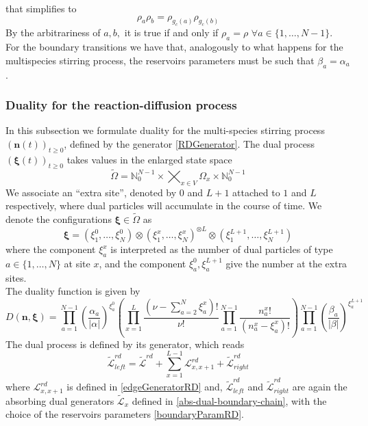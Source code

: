 \documentclass[10pt]{article}
\numberwithin{equation}{section}
\numberwithin{equation}{subsection}
\begin{document}
that simplifies to 
\begin{equation}
	\rho_{a}\rho_{b}=\rho_{g_{c}(a)}\rho_{g_{c}(b)}
\end{equation}
By the arbitrariness of $a,b,$ it is true if and only if $\rho_{a}=\rho$ $\forall a\in \{1,\ldots,N-1\}$.\\
For the boundary transitions we have that, analogously to what happens for the multispecies stirring process, the reservoirs parameters must be such that $\beta_{a}=\alpha_{a}$.
\subsubsection{Duality for the reaction-diffusion process}
In this subsection we formulate duality for the multi-species stirring process $(\bm{n}(t))_{t\geq 0}$, defined by the generator \eqref{RDGenerator}.
The dual  process $(\bm{\xi}(t))_{t\geq 0}$ takes values in the enlarged state space
\begin{equation}
	\widetilde{\Omega}=\mathbb{N}_{0}^{N-1}\times  \bigtimes_{x\in V} \Omega_{x}\times \mathbb{N}_{0}^{N-1}
\end{equation}
We associate an ``extra site'', denoted by $0$ and $L+1$ attached to $1$ and $L$ respectively,
where dual particles will accumulate in the course of time. 
We denote the configurations $\bm{\xi} \in \widetilde\Omega$  as
\begin{equation}
	\bm{\xi}=\left(\xi_{1}^{0},\ldots,\xi_{N}^{0}\right)\otimes\left(\xi_{1}^{x},\ldots,\xi_{N}^{x}\right)^{\otimes L}\otimes \left(\xi_{1}^{L+1},\ldots,\xi_{N}^{L+1}\right)
\end{equation}
where the component $\xi_{a}^{x}$ is interpreted as the number of dual particles of type $a\in \{1,\ldots,N\}$ at site $x$, 
and the component $\xi_{a}^{0},\xi_{a}^{L+1}$  give the number at the extra sites. \\
The duality function is given by
\begin{equation}
	D(\bm{n},\bm{\xi})=\prod_{a=1}^{N-1}\left(\frac{\alpha_{a}}{|\alpha|}\right)^{\xi_{a}^{0}}\left(\prod_{x=1}^{L}\frac{(\nu -\sum_{a=2}^{N}\xi_{a}^{x})!}{\nu!}\prod_{a=1}^{N-1}\frac{n_{a}^{x}!}{(n_{a}^{x}-\xi_{a}^{x})!}\right)\prod_{a=1}^{N-1}\left(\frac{\beta_{a}}{|\beta|}\right)^{\xi_{a}^{L+1}}
\end{equation}
The dual process is defined by its generator, which reads
\begin{equation}\label{DualGeneratorRD}
	\widetilde{\mathcal{L}}_{left}^{rd}=\widetilde{\mathcal{L}}^{rd}+\sum_{x=1}^{L-1}\mathcal{L}_{x,x+1}^{rd}+\widetilde{\mathcal{L}}_{right}^{rd}
\end{equation}
where 
$\mathcal{L}_{x,x+1}^{rd}$ is defined in \eqref{edgeGeneratorRD} and, $\widetilde{\mathcal{L}}_{left}^{rd}$ and $\widetilde{\mathcal{L}}_{right}^{rd}$ are again the absorbing dual generators $\widetilde{\mathcal{L}}_{x}$ defined in \eqref{abs-dual-boundary-chain}, with the choice of the reservoirs parameters \eqref{boundaryParamRD}.
\end{document}
